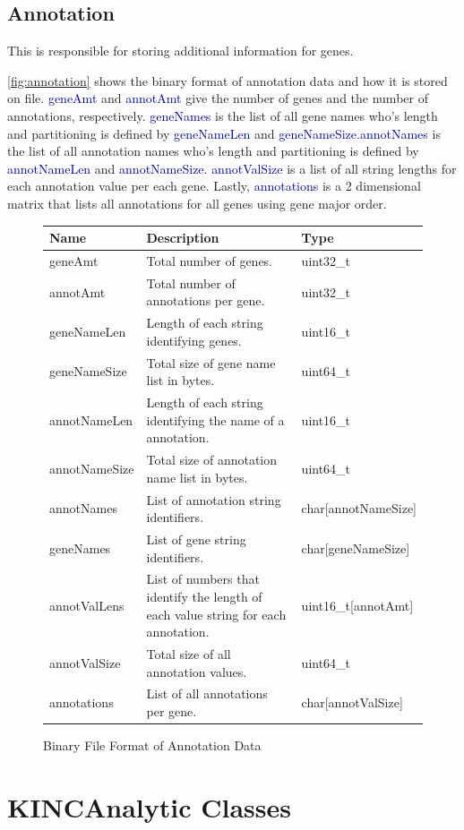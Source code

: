\documentclass[10pt]{article}
\providecommand{\btable}[3]
{
\begin{figure}[H]
\begin{mdframed}[hidealllines=true,backgroundcolor=btablecol]
\begin{tabularx}{\textwidth}{|l|X|l|}
\hline
\textbf{Name} & \textbf{Description} & \textbf{Type} \\
\hline
#3
\hline
\end{tabularx}
\end{mdframed}
\caption{#1}
\label{#2}
\end{figure}
}
\providecommand{\h}[1]{\textcolor{darkblue}{#1}}
\begin{document}
\subsection{Annotation}

This is responsible for storing additional information for genes.

\autoref{fig:annotation} shows the binary format of annotation data and how it 
is stored on file. \h{geneAmt} and \h{annotAmt} give the number of genes and 
the number of annotations, respectively. \h{geneNames} is the list of all gene 
names who's length and partitioning is defined by \h{geneNameLen} and 
\h{geneNameSize}.\h{annotNames} is the list of all annotation names who's 
length and partitioning is defined by \h{annotNameLen} and \h{annotNameSize}.
\h{annotValSize} is a list of all string lengths for each annotation value per 
each gene. Lastly, \h{annotations} is a 2 dimensional matrix that lists all 
annotations for all genes using gene major order.

\btable{Binary File Format of Annotation Data}{fig:annotation}{
geneAmt & Total number of genes. & uint32\_t \\
\hline
annotAmt & Total number of annotations per gene. & uint32\_t \\
\hline
geneNameLen & Length of each string identifying genes. & uint16\_t \\
\hline
geneNameSize & Total size of gene name list in bytes. & uint64\_t \\
\hline
annotNameLen & Length of each string identifying the name of a annotation. & 
uint16\_t \\
\hline
annotNameSize & Total size of annotation name list in bytes. & uint64\_t \\
\hline
annotNames & List of annotation string identifiers. & char[annotNameSize] \\
\hline
geneNames & List of gene string identifiers. & char[geneNameSize] \\
\hline
annotValLens & List of numbers that identify the length of each value string 
for each annotation. & uint16\_t[annotAmt] \\
\hline
annotValSize & Total size of all annotation values. & uint64\_t \\
\hline
annotations & List of all annotations per gene. & char[annotValSize] \\
}

\newpage
\section{KINCAnalytic Classes}
\end{document}
